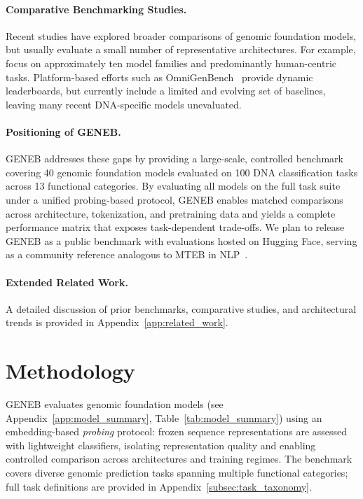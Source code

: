 \documentclass{article}
\theoremstyle{plain}
\theoremstyle{definition}
\theoremstyle{remark}
\begin{document}
\paragraph{Comparative Benchmarking Studies.}
Recent studies have explored broader comparisons of genomic foundation models, but usually evaluate a small number of representative architectures. For example, \citet{wang2025genomic} focus on approximately ten model families and predominantly human-centric tasks. Platform-based efforts such as OmniGenBench~\citep{wang2025omnigenbenchbenchmarkomnipotentmultimodal} provide dynamic leaderboards, but currently include a limited and evolving set of baselines, leaving many recent DNA-specific models unevaluated.

\paragraph{Positioning of GENEB.}
GENEB addresses these gaps by providing a large-scale, controlled benchmark covering 40 genomic foundation models evaluated on 100 DNA classification tasks across 13 functional categories. By evaluating all models on the full task suite under a unified probing-based protocol, GENEB enables matched comparisons across architecture, tokenization, and pretraining data and yields a complete performance matrix that exposes task-dependent trade-offs. We plan to release GENEB as a public benchmark with evaluations hosted on Hugging Face, serving as a community reference analogous to MTEB in NLP~\citep{muennighoff2023mtebmassivetextembedding}.

\paragraph{Extended Related Work.}
A detailed discussion of prior benchmarks, comparative studies, and architectural trends is provided in Appendix~\ref{app:related_work}.

\section{Methodology}

GENEB evaluates genomic foundation models (see Appendix~\ref{app:model_summary}, Table~\ref{tab:model_summary}) using an embedding-based \emph{probing} protocol: frozen sequence representations are assessed with lightweight classifiers, isolating representation quality and enabling controlled comparison across architectures and training regimes. The benchmark covers diverse genomic prediction tasks spanning multiple functional categories; full task definitions are provided in Appendix~\ref{subsec:task_taxonomy}.
\end{document}
